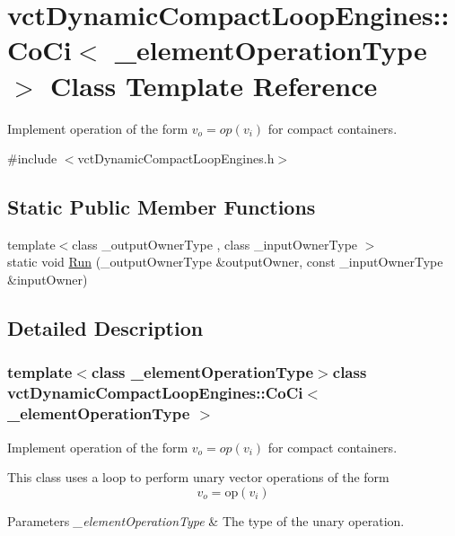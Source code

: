 \hypertarget{classvct_dynamic_compact_loop_engines_1_1_co_ci}{}\section{vct\+Dynamic\+Compact\+Loop\+Engines\+:\+:Co\+Ci$<$ \+\_\+element\+Operation\+Type $>$ Class Template Reference}
\label{classvct_dynamic_compact_loop_engines_1_1_co_ci}


Implement operation of the form $v_o = op(v_i)$ for compact containers.  




{\ttfamily \#include $<$vct\+Dynamic\+Compact\+Loop\+Engines.\+h$>$}

\subsection*{Static Public Member Functions}
\begin{DoxyCompactItemize}
\item 
{\footnotesize template$<$class \+\_\+output\+Owner\+Type , class \+\_\+input\+Owner\+Type $>$ }\\static void \hyperlink{classvct_dynamic_compact_loop_engines_1_1_co_ci_a555df15ceb109da0d6577e952e550e79}{Run} (\+\_\+output\+Owner\+Type \&output\+Owner, const \+\_\+input\+Owner\+Type \&input\+Owner)
\end{DoxyCompactItemize}


\subsection{Detailed Description}
\subsubsection*{template$<$class \+\_\+element\+Operation\+Type$>$class vct\+Dynamic\+Compact\+Loop\+Engines\+::\+Co\+Ci$<$ \+\_\+element\+Operation\+Type $>$}

Implement operation of the form $v_o = op(v_i)$ for compact containers. 

This class uses a loop to perform unary vector operations of the form \[ v_{o} = \mathrm{op}(v_{i}) \]


\begin{DoxyParams}{Parameters}
{\em \+\_\+element\+Operation\+Type} & The type of the unary operation. \\
\hline
\end{DoxyParams}


